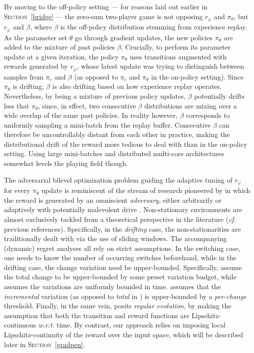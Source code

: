 By moving to the off-policy setting
--- for reasons laid out earlier in \textsc{Section}~\ref{bridge} ---
the zero-sum two-player game is not opposing $r_\varphi$ and $\pi_\theta$,
but $r_\varphi$ and $\beta$, where $\beta$ is the off-policy distribution
stemming from experience replay.
As the parameter set $\theta$ go through gradient updates,
the new policies $\pi_\theta$ are
added to the mixture of past policies $\beta$.
Crucially, to perform its parameter update at a given iteration, the policy $\pi_\theta$
uses transitions augmented with rewards generated by $r_\varphi$,
whose latest update was trying to distinguish between samples from $\pi_e$ and $\beta$
(as opposed to $\pi_e$ and $\pi_\theta$ in the on-policy setting).
Since $\pi_\theta$ is drifting, $\beta$ is also drifting based on how experience replay operates.
Nevertheless, by being a mixture of previous policy updates, $\beta$ potentially drifts less
that $\pi_\theta$, since, in effect, two consecutive $\beta$ distributions
are mixing over a wide overlap of the same past policies.
In reality however, $\beta$ corresponds to uniformly sampling a mini-batch from
the replay buffer. Consecutive $\beta$ can therefore
be uncontrollably distant from each other in practice, making the distributional drift
of the reward more tedious to deal with than in the on-policy setting.
Using large mini-batches and distributed multi-core architectures
somewhat levels the playing field though.

The adversarial bilevel optimization problem guiding the adaptive tuning of $r_\varphi$
for every $\pi_\theta$ update
is reminiscent of the stream of research pioneered by \cite{Auer1995-mm}
in which the reward is generated by an omniscient \emph{adversary},
either arbitrarily or adaptively with potentially malevolent drive
\cite{Yu2009-xp,Yu2009-yo,Lim2013-ml,Gajane2018-ee,Yu2019-sc}.
Non-stationary environments are almost exclusively tackled from a theoretical perspective
in the literature (\textit{cf.} previous references).
Specifically, in the \emph{drifting} case, the non-stationarities are traditionally dealt with
via the use of sliding windows.
The accompanying (dynamic) regret analyses all rely on strict assumptions.
In the switching case, one needs to know the number of occurring switches beforehand,
while in the drifting case, the change variation need be upper-bounded.
Specifically, \cite{Besbes2014-hm,Cheung2019-yq} assume the total change to be
upper-bounded by some preset variation budget,
while \cite{Cheung2019-cu} assumes the variations are uniformly bounded in time.
\cite{Ortner2019-pw} assumes that the \textit{incremental}
variation (as opposed to \textit{total} in \cite{Besbes2014-hm,Cheung2019-yq}) is upper-bounded
by a \textit{per-change} threshold.
Finally, in the same vein, \cite{Lecarpentier2019-av} posits \emph{regular evolution},
by making the assumption that both the transition and reward functions are Lipschitz-continuous
\textit{w.r.t.} time.
By contrast, our approach relies on imposing local Lipschitz-continuity of the reward
over the input space, which will be described later in \textsc{Section}~\ref{gradpen}.

